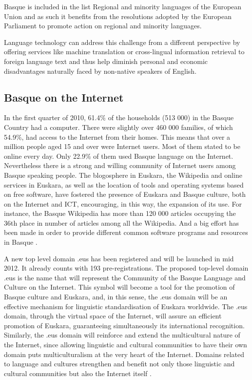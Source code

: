 \begin{multicols}{2}
Basque is included in the list Regional and minority languages of the European Union \cite{BAS-Nota15} and as such it benefits from the resolutions adopted by the European Parliament to promote action on regional and minority languages.

Language technology can address this challenge from a different perspective by offering services like machine translation or cross-lingual information retrieval to foreign language text and thus help diminish personal and economic disadvantages naturally faced by non-native speakers of English.

\subsection{Basque on the Internet}
   In the first quarter of 2010, 61.4\% of the households (513 000) in the Basque Country had a computer. There were slightly over      460 000 families, of which 54.9\%, had access to the Internet from their homes. This means that over a million people aged 15 and over were Internet users. Most of them stated to be online every day. Only 22.9\% of them used Basque language on the Internet. \cite{BAS-Nota16}  Nevertheless there is a strong and willing community of Internet users among Basque speaking people. The blogosphere in Euskara, the Wikipedia and online services in Euskara, as well as the location of tools and operating systems based on free software, have fostered the presence of Euskara and Basque culture, both on the Internet and ICT, encouraging, in this way, the expansion of its use. For instance, the Basque Wikipedia has more than 120 000 articles occupying the 36th place in number of articles among all the Wikipedia. And a big effort has been made in order to provide different common software programs \cite{BAS-Nota17,BAS-Nota18}  and resources in Basque \cite{BAS-Nota19,BAS-Nota20,BAS-Nota21,BAS-Nota22, BAS-Nota22b}.


A new top level domain .eus has been registered and will be launched in mid 2012. It already counts with 193 pre-registrations. The proposed top-level domain .eus is the name that will represent the Community of the Basque Language and Culture on the Internet. This symbol will become a tool for the promotion of Basque culture and Euskara, and, in this sense, the .eus domain will be an effective mechanism for linguistic standardisation of Euskara worldwide. The .eus domain, through the virtual space of the Internet, will assure an efficient promotion of Euskara, guaranteeing simultaneously its international recognition. Similarly, the .eus domain will reinforce and extend the multicultural nature of the Internet, since allowing linguistic and cultural communities to have their own domain puts multiculturalism at the very heart of the Internet. Domains related to language and cultures strengthen and benefit not only those linguistic and cultural communities but also the Internet itself  \cite{BAS-Nota23}. 


\end{multicols}
